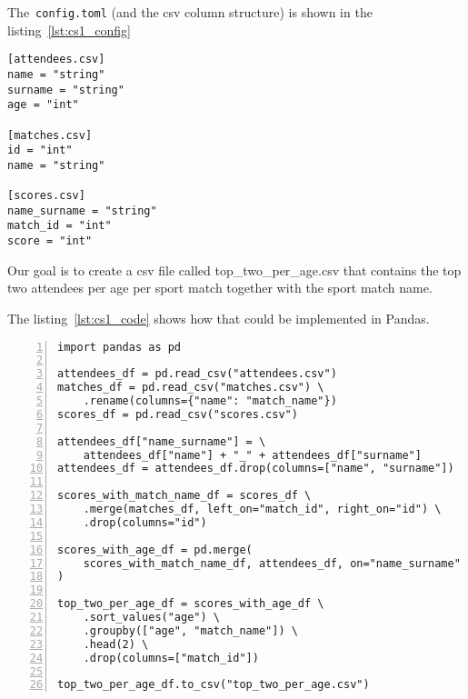 The~\verb|config.toml| (and the csv column structure) is shown in the listing~\ref{lst:cs1_config}

\begin{lstlisting}[caption=config.toml of the first case study, label={lst:cs1_config}, captionpos=b]
[attendees.csv]
name = "string"
surname = "string"
age = "int"

[matches.csv]
id = "int"
name = "string"

[scores.csv]
name_surname = "string"
match_id = "int"
score = "int"
\end{lstlisting}

Our goal is to create a csv file called top\_two\_per\_age.csv that contains the top two attendees per age per sport match
together with the sport match name.

The listing~\ref{lst:cs1_code} shows how that could be implemented in Pandas.

\begin{lstlisting}[caption=Solution of the first case study in Pandas, label={lst:cs1_code}, captionpos=b, numbers=left]
import pandas as pd

attendees_df = pd.read_csv("attendees.csv")
matches_df = pd.read_csv("matches.csv") \
    .rename(columns={"name": "match_name"})
scores_df = pd.read_csv("scores.csv")

attendees_df["name_surname"] = \
    attendees_df["name"] + "_" + attendees_df["surname"]
attendees_df = attendees_df.drop(columns=["name", "surname"])

scores_with_match_name_df = scores_df \
    .merge(matches_df, left_on="match_id", right_on="id") \
    .drop(columns="id")

scores_with_age_df = pd.merge(
    scores_with_match_name_df, attendees_df, on="name_surname"
)

top_two_per_age_df = scores_with_age_df \
    .sort_values("age") \
    .groupby(["age", "match_name"]) \
    .head(2) \
    .drop(columns=["match_id"])

top_two_per_age_df.to_csv("top_two_per_age.csv")
\end{lstlisting}

